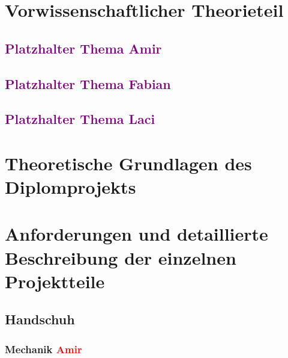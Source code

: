\documentclass[11pt]{article}
\begin{document}
\section{Vorwissenschaftlicher Theorieteil}

\subsection{\textcolor{purple}{Platzhalter Thema Amir}}
\subsection{\textcolor{purple}{Platzhalter Thema Fabian}}
\subsection{\textcolor{purple}{Platzhalter Thema Laci}}

\section{Theoretische Grundlagen des Diplomprojekts}


\section{Anforderungen und detaillierte Beschreibung der einzelnen Projektteile}

\subsection{Handschuh}

\subsubsection{Mechanik \textcolor{red}{Amir}}
\end{document}
